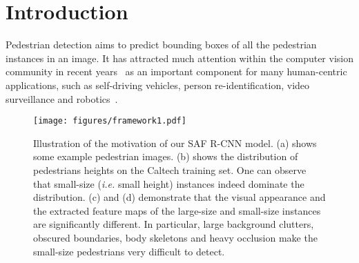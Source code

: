 \documentclass[journal]{IEEEtran}
\begin{document}
\section{Introduction}

Pedestrian detection  aims to predict bounding boxes of all the pedestrian instances in an image. It has attracted much attention within the computer vision community in recent years~\cite{dalal2005histograms,viola2003detecting,wang2009hog,dollar2009integral,compact,dollar2014fast,zhang2014informed,felzenszwalb2010object,marin2014occlusion} as an important component for many  human-centric applications, such as self-driving vehicles, person re-identification, video surveillance and robotics~\cite{li2014deepreid,wang2014scene}.

\begin{figure}
	\begin{center}
		\texttt{[image: figures/framework1.pdf]}
		\caption{Illustration of the motivation of our SAF R-CNN model. (a) shows some example pedestrian images. (b) shows the distribution of pedestrians heights on the Caltech training set. One can observe that small-size (\emph{i.e.} small height) instances indeed dominate the distribution. (c) and (d) demonstrate that the visual appearance and the extracted feature maps of the large-size and small-size instances are significantly different. 
			In particular, large background clutters, obscured boundaries, body skeletons and heavy occlusion make the small-size pedestrians very difficult to detect.
		}
		\label{fig:motivation}
	\end{center}
	\vspace{-4mm}
\end{figure}
\end{document}
